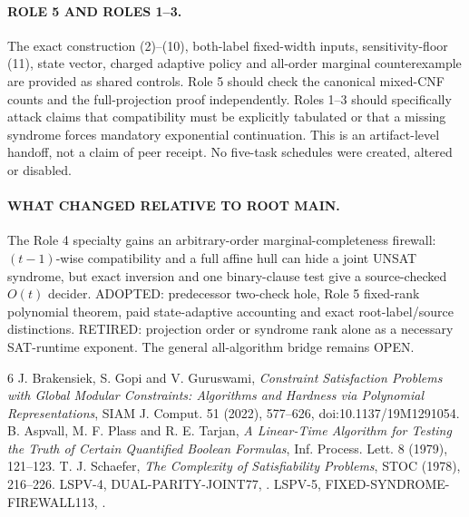 \documentclass[11pt]{article}
\begin{document}
\paragraph{ROLE 5 AND ROLES 1--3.}
The exact construction (2)--(10), both-label fixed-width inputs,
sensitivity-floor (11), state vector, charged adaptive policy and
all-order marginal counterexample are provided as shared controls.
Role 5 should check the canonical mixed-CNF counts and the
full-projection proof independently. Roles 1--3 should specifically
attack claims that compatibility must be explicitly tabulated or that
a missing syndrome forces mandatory exponential continuation.
This is an artifact-level handoff, not a claim of peer receipt.
No five-task schedules were created, altered or disabled.

\paragraph{WHAT CHANGED RELATIVE TO ROOT MAIN.}
The Role 4 specialty gains an arbitrary-order marginal-completeness
firewall: \((t-1)\)-wise compatibility and a full affine hull can hide a
joint UNSAT syndrome, but exact inversion and one binary-clause test
give a source-checked \(O(t)\) decider. ADOPTED: predecessor two-check
hole, Role 5 fixed-rank polynomial theorem, paid state-adaptive
accounting and exact root-label/source distinctions.
RETIRED: projection order or syndrome rank alone as a necessary
SAT-runtime exponent. The general all-algorithm bridge remains OPEN.

\begin{thebibliography}{6}
 J. Brakensiek, S. Gopi and V. Guruswami,
\emph{Constraint Satisfaction Problems with Global Modular Constraints:
Algorithms and Hardness via Polynomial Representations},
SIAM J. Comput. 51 (2022), 577--626,
doi:10.1137/19M1291054.
 B. Aspvall, M. F. Plass and R. E. Tarjan,
\emph{A Linear-Time Algorithm for Testing the Truth of Certain
Quantified Boolean Formulas}, Inf. Process. Lett. 8 (1979), 121--123.
 T. J. Schaefer, \emph{The Complexity of
Satisfiability Problems}, STOC (1978), 216--226.
 LSPV-4, DUAL-PARITY-JOINT77,
.
 LSPV-5, FIXED-SYNDROME-FIREWALL113,
.
\end{thebibliography}
\end{document}
